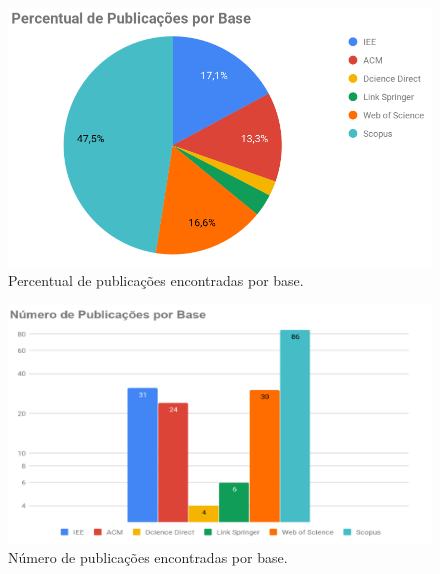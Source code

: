 \documentclass[ti,table]{texufpel} %
\begin{document}
  

  

\begin{figure}[ht] 

    \centering 

    \includegraphics[width=.9\textwidth]{imagens/GrafPizPubAno.png} 

    \caption{Percentual de publicações encontradas por base.} 

    \label{fig:GrafPizPubAno} 

\end{figure} 

  

\begin{figure}[ht] 

    \centering 

    \includegraphics[width=.9\textwidth]{imagens/GrafBarraPubAno.png} 

    \caption{Número de publicações encontradas por base.} 

    \label{fig:GrafBarraPubAno} 

\end{figure} 

  
\end{document}
